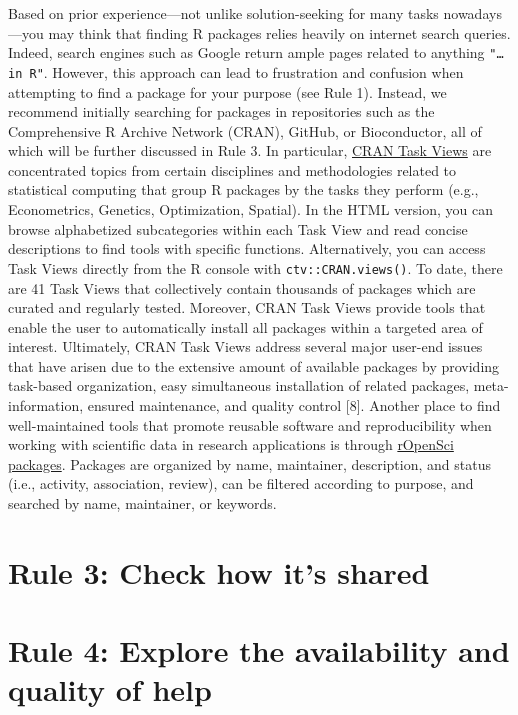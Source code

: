\documentclass[10pt,letterpaper]{article}
\begin{document}
Based on prior experience---not unlike solution-seeking for many tasks
nowadays---you may think that finding R packages relies heavily on
internet search queries. Indeed, search engines such as Google return
ample pages related to anything \texttt{"\ldots{}in\ R"}. However, this
approach can lead to frustration and confusion when attempting to find a
package for your purpose (see Rule 1). Instead, we recommend initially
searching for packages in repositories such as the Comprehensive R
Archive Network (CRAN), GitHub, or Bioconductor, all of which will be
further discussed in Rule 3. In particular,
\href{https://cran.r-project.org/web/views/}{CRAN Task Views} are
concentrated topics from certain disciplines and methodologies related
to statistical computing that group R packages by the tasks they perform
(e.g., Econometrics, Genetics, Optimization, Spatial). In the HTML
version, you can browse alphabetized subcategories within each Task View
and read concise descriptions to find tools with specific functions.
Alternatively, you can access Task Views directly from the R console
with \texttt{ctv::CRAN.views()}. To date, there are 41 Task Views that
collectively contain thousands of packages which are curated and
regularly tested. Moreover, CRAN Task Views provide tools that enable
the user to automatically install all packages within a targeted area of
interest. Ultimately, CRAN Task Views address several major user-end
issues that have arisen due to the extensive amount of available
packages by providing task-based organization, easy simultaneous
installation of related packages, meta-information, ensured maintenance,
and quality control {[}8{]}. Another place to find well-maintained tools
that promote reusable software and reproducibility when working with
scientific data in research applications is through
\href{https://ropensci.org/packages/}{rOpenSci packages}. Packages are
organized by name, maintainer, description, and status (i.e., activity,
association, review), can be filtered according to purpose, and searched
by name, maintainer, or keywords.

\hypertarget{rule-3-check-how-its-shared}{%
\section{Rule 3: Check how it's
shared}\label{rule-3-check-how-its-shared}}

\hypertarget{rule-4-explore-the-availability-and-quality-of-help}{%
\section{Rule 4: Explore the availability and quality of
help}\label{rule-4-explore-the-availability-and-quality-of-help}}
\end{document}
